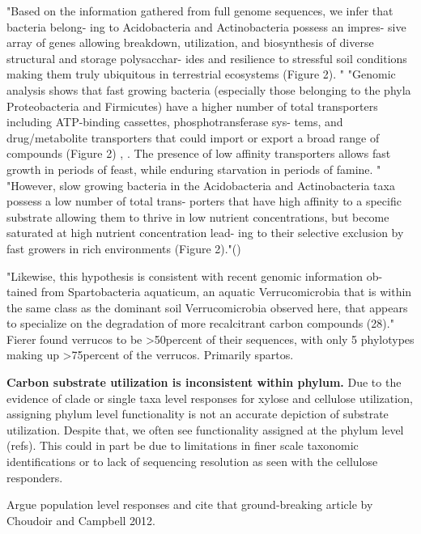 "Based on the information gathered from full genome sequences, we infer that bacteria belong- ing to Acidobacteria and Actinobacteria possess an impres- sive array of genes allowing breakdown, utilization, and biosynthesis of diverse structural and storage polysacchar- ides and resilience to stressful soil conditions making them truly ubiquitous in terrestrial ecosystems (Figure 2). \cite{Trivedi_2013}" "Genomic analysis shows that fast growing bacteria (especially those belonging to the phyla Proteobacteria and Firmicutes) have a higher number of total transporters including ATP-binding cassettes, phosphotransferase sys- tems, and drug/metabolite transporters that could import or export a broad range of compounds (Figure 2) \cite{Barabote_2005}, \cite{Trivedi_2013}. The presence of low affinity transporters allows fast growth in periods of feast, while enduring starvation in periods of famine. "
"However, slow growing bacteria in the Acidobacteria and Actinobacteria taxa possess a low number of total trans- porters that have high affinity to a specific substrate allowing them to thrive in low nutrient concentrations, but become saturated at high nutrient concentration lead- ing to their selective exclusion by fast growers in rich environments (Figure 2)."(\cite{Trivedi_2013})

"Likewise, this hypothesis is consistent with recent genomic information ob- tained from Spartobacteria aquaticum, an aquatic Verrucomicrobia that is within the same class as the dominant soil Verrucomicrobia observed here, that appears to specialize on the degradation of more recalcitrant carbon compounds (28)."  Fierer found verrucos to be >50percent of their sequences, with only 5 phylotypes making up >75percent of the verrucos.  Primarily spartos.  \cite{Fierer_2013} 

\textbf{Carbon substrate utilization is inconsistent within phylum.} Due to the evidence of clade or single taxa level responses for xylose and cellulose utilization, assigning phylum level functionality is not an accurate depiction of substrate utilization. Despite that, we often see functionality assigned at the phylum level (refs). This could in part be due to limitations in finer scale taxonomic identifications or to lack of sequencing resolution as seen with the cellulose responders. 

Argue population level responses and cite that ground-breaking article by Choudoir and Campbell 2012.  
   


 

